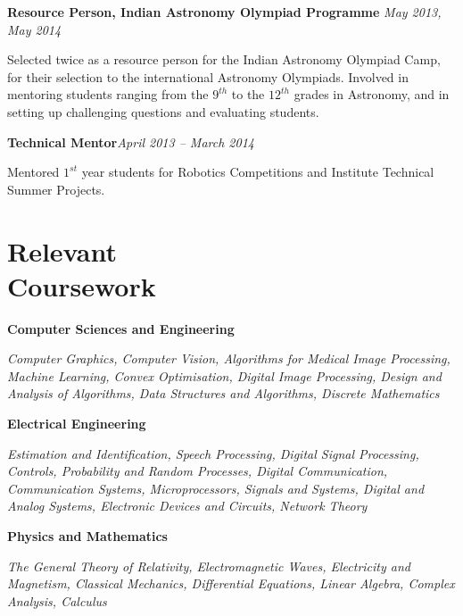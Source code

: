 \documentclass[margin,line]{res}
\newenvironment{list1}{
  \begin{list}{\ding{113}}{%
      \setlength{\itemsep}{0in}
      \setlength{\parsep}{0in} \setlength{\parskip}{0in}
      \setlength{\topsep}{0in} \setlength{\partopsep}{0in} 
      \setlength{\leftmargin}{0.17in}}}{\end{list}}
\begin{document}
\begin{resume}
\vspace*{-0.1in}

\textbf{Resource Person, Indian Astronomy Olympiad Programme} \hfill \textit{May 2013, May 2014} \\
\vspace*{-.15in}
\begin{list1}
\item[] Selected twice as a resource person for the Indian Astronomy Olympiad Camp, for their selection to the international Astronomy Olympiads. Involved in mentoring students ranging from the $9^{th}$ to the $12^{th}$ grades in Astronomy, and in setting up challenging questions and evaluating students.
\end{list1}

\vspace*{-0.1in}

\textbf{Technical Mentor}\hfill \textit{April 2013 -- March 2014} \\
\vspace*{-.15in}
\begin{list1}
\item[] Mentored $1^{st}$ year students for Robotics Competitions and Institute Technical Summer Projects.
\end{list1}

\section{\sc Relevant \\Coursework} 
\begin{list1}
\item[\strut\hspace{0.5cm}\hypertarget{crselst}{\textbf{Computer Sciences and Engineering}}]
\item[]\textit{Computer Graphics, Computer Vision, Algorithms for Medical Image Processing, Machine Learning, Convex Optimisation, Digital Image Processing, Design and Analysis of Algorithms, Data Structures and Algorithms, Discrete Mathematics}
\item[\strut\hspace{0.5cm}\textbf{Electrical Engineering}]
\vspace{0.05in}
\item[]\textit{Estimation and Identification, Speech Processing, Digital Signal Processing, Controls, Probability and Random Processes, Digital Communication, Communication Systems, Microprocessors, Signals and Systems, Digital and Analog Systems, Electronic Devices and Circuits, Network Theory}
\item[\strut\hspace{0.5cm}\textbf{Physics and Mathematics}]
\vspace{0.05in}
\item[]\textit{The General Theory of Relativity, Electromagnetic Waves, Electricity and Magnetism, Classical Mechanics, Differential Equations, Linear Algebra, Complex Analysis, Calculus}
\end{list1}


\end{resume}
\end{document}
